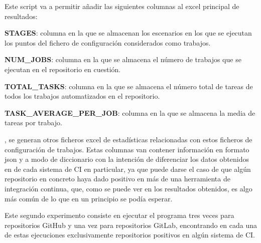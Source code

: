 Este script va a permitir añadir las siguientes columnas al excel principal de resultados:
\begin{compactitem}
    \item \textbf{STAGES}: columna en la que se almacenan los escenarios en los que se ejecutan los puntos del fichero de configuración considerados como trabajos.
    \item \textbf{NUM\_JOBS}: columna en la que se almacena el número de trabajos que se ejecutan en el repositorio en cuestión.
    \item \textbf{TOTAL\_TASKS}: columna en la que se almacena el número total de tareas de todos los trabajos automatizados en el repositorio.
    \item \textbf{TASK\_AVERAGE\_PER\_JOB}: columna en la que se almacena la media de tareas por trabajo.
\end{compactitem}

, se generan otros ficheros excel de estadísticas relacionadas con estos ficheros de configuración de trabajos. Estas columnas van contener información en formato json y a modo de diccionario con la intención de diferenciar los datos obtenidos en de cada sistema de CI en particular, ya que puede darse el caso de que algún repositorio en concreto haya dado positivo en más de una herramienta de integración continua, que, como se puede ver en los resultados obtenidos, es algo más común de lo que en un principio se podía esperar.

Este segundo experimento consiste en ejecutar el programa tres veces para repositorios GitHub y una vez para repositorios GitLab, encontrando en cada una de estas ejecuciones exclusivamente repositorios positivos en algún sistema de CI. 

